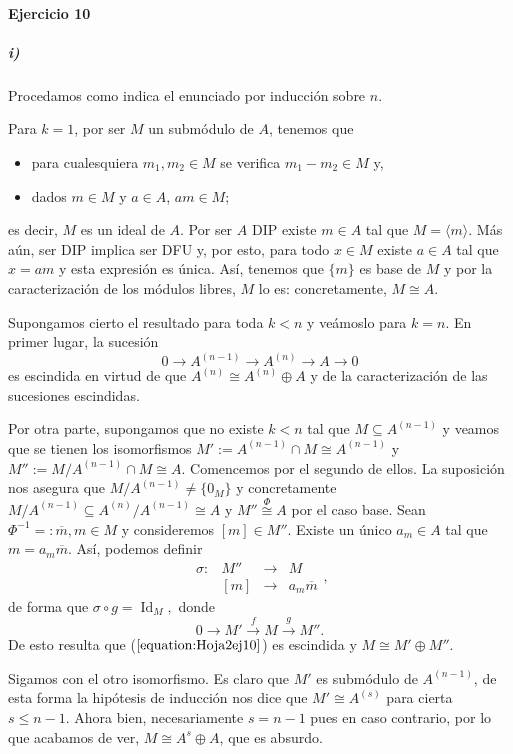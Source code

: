 \documentclass[./ejercicios.tex]{subfiles}
\begin{document}
\paragraph{Ejercicio 10}
\subparagraph{i)} Procedamos como indica el enunciado por inducción sobre $n$.

Para $k=1$, por ser $M$ un submódulo de $A$, tenemos que
\begin{itemize}
	\item para cualesquiera $m_1,m_2\in M$ se verifica $m_1-m_2\in M$ y,
	\item dados $m\in M$ y $a\in A$, $am\in M;$
\end{itemize}
es decir, $M$ es un ideal de $A$. Por ser $A$ DIP existe $m\in A$ tal que $M=\langle m\rangle$. Más aún, ser DIP implica ser DFU y, por esto, para todo $x\in M$ existe $a\in A$ tal que $x=am$ y esta expresión es única. Así, tenemos que $\{m\}$ es base de $M$ y por la caracterización de los módulos libres, $M$ lo es: concretamente, $M\cong A$.

Supongamos cierto el resultado para toda $k<n$ y veámoslo para $k=n$. En primer lugar, la sucesión
$$0\longrightarrow A^{(n-1)}\longrightarrow A^{(n)}\longrightarrow A\longrightarrow 0$$
es escindida en virtud de que $A^{(n)}\cong A^{(n)}\oplus A$ y de la caracterización de las sucesiones escindidas.

Por otra parte, supongamos que no existe $k<n$ tal que $M\subseteq A^{(n-1)}$ y veamos que se tienen los isomorfismos $M':=A^{(n-1)}\cap M\cong A^{(n-1)}$ y $M'':=M/{A^{(n-1)}\cap M}\cong A$. 
Comencemos por el segundo de ellos. La suposición nos asegura que $M/{A^{(n-1)}}\neq \{0_M\}$ y concretamente $M/{A^{(n-1)}}\subseteq A^{(n)}/{A^{(n-1)}}\cong A$ y $M''\overset{\Phi}{\cong}A$ por el caso base. 
Sean $\Phi^{-1}=:\overline{m},m\in M$ y consideremos $[m]\in M''$. Existe un único $a_m\in A$ tal que $m=a_m\overline{m}$. Así, podemos definir
$$\begin{array}{rrcl}
\sigma:&M''&\longrightarrow&M\\
&[m]&\longrightarrow&a_m\overline{m}
\end{array},$$
de forma que $\sigma\circ g=\operatorname{Id}_M,$ donde
\begin{equation}\label{equation:Hoja2ej10}
0\overset{}{\longrightarrow}M'\overset{f}{\longrightarrow}M\overset{g}{\longrightarrow}M''.
\end{equation}
De esto resulta que ($\ref{equation:Hoja2ej10}$) es escindida y $M\cong M'\oplus M''$.

Sigamos con el otro isomorfismo. Es claro que $M'$ es submódulo de $A^{(n-1)}$, de esta forma la hipótesis de inducción nos dice que $M'\cong A^{(s)}$ para cierta $s\le n-1$. Ahora bien, necesariamente $s=n-1$ pues en caso contrario, por lo que acabamos de ver, $M\cong A^{s}\oplus A$, que es absurdo.
\end{document}
